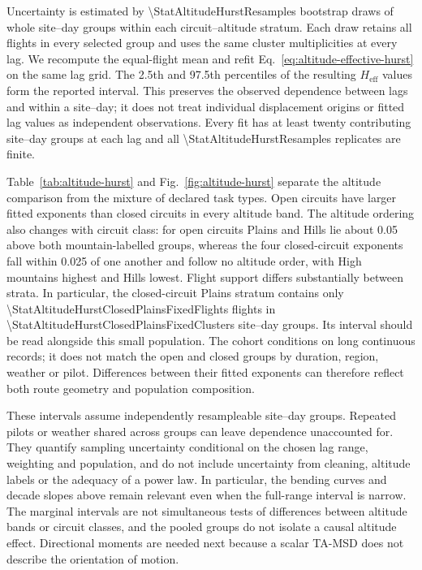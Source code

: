 Uncertainty is estimated by \num{\StatAltitudeHurstResamples} bootstrap draws
of whole site--day groups within each circuit--altitude stratum. Each draw retains all
flights in every selected group and uses the same cluster multiplicities at
every lag. We recompute the equal-flight mean and
refit Eq.~\eqref{eq:altitude-effective-hurst} on the same lag grid. The 2.5th and
97.5th percentiles of the resulting $H_{\mathrm{eff}}$ values form the reported
interval. This preserves the observed dependence between lags and within a
site--day; it does not treat individual displacement origins or fitted lag
values as independent observations. Every fit has at least twenty contributing
site--day groups at each lag and all
\num{\StatAltitudeHurstResamples} replicates are finite.

\begin{table}[htbp]
 \centering
 \caption{Paraglider effective exponents $H_{\mathrm{eff}}$ from the full
 10--10,000-s fit, separately for declared open and closed circuits.
 Brackets give marginal 95\% site--day bootstrap intervals. Flight counts give the
 fixed cohort, which contributes the same flights at every lag. Weighting matches
 Fig.~\ref{fig:altitude-hurst}.}
 \label{tab:altitude-hurst}
 \small
 
\end{table}

Table~\ref{tab:altitude-hurst} and Fig.~\ref{fig:altitude-hurst} separate the
altitude comparison from the mixture of declared task types. Open circuits have
larger fitted exponents than closed circuits in every altitude band. The altitude
ordering also changes with circuit class: for open circuits Plains and Hills lie
about 0.05 above both mountain-labelled groups, whereas the four closed-circuit
exponents fall within 0.025 of one another and follow no altitude order, with High
mountains highest and Hills lowest. Flight support differs substantially between
strata. In particular, the closed-circuit Plains stratum contains only
\num{\StatAltitudeHurstClosedPlainsFixedFlights} flights in
\num{\StatAltitudeHurstClosedPlainsFixedClusters} site--day groups. Its interval
should be read alongside this small population. The cohort conditions on long
continuous records; it does not match the open and closed groups by duration,
region, weather or pilot. Differences between their fitted exponents can therefore
reflect both route geometry and population composition.

These intervals assume independently resampleable site--day groups. Repeated
pilots or weather shared across groups can leave dependence unaccounted for.
They quantify sampling uncertainty conditional on the chosen lag range,
weighting and population, and do not include uncertainty from cleaning,
altitude labels or the adequacy of a power law. In particular, the bending
curves and decade slopes above remain relevant even when the full-range
interval is narrow. The marginal intervals are not simultaneous tests of
differences between altitude bands or circuit classes, and the pooled groups do not isolate a
causal altitude effect. Directional moments are needed next because a scalar
TA-MSD does not describe the orientation of motion.

\FloatBarrier
